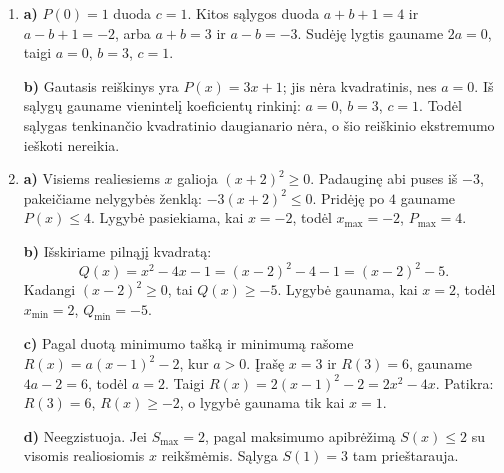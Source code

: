 \documentclass[12pt,a4paper]{article}
\begin{document}
\begin{enumerate}
\textbf{b)} $P(1)=3$, $P(-1)=-13$. Todėl $P(1)-P(-1)=3-(-13)=16=2b$.

\textbf{c)} Išskyrę pilnąjį kvadratą gauname $P(x)=-2(x-2)^2+5$. Kadangi $(x-2)^2\ge0$, padauginę abi puses iš $-2$ pakeičiame nelygybės ženklą: $-2(x-2)^2\le0$. Pridėję po $5$ gauname $P(x)\le5$. Lygybė gaunama tik kai $x=2$, todėl $x_{\max}=2$, $P_{\max}=5$.
\item \textbf{a)} $P(0)=1$ duoda $c=1$. Kitos sąlygos duoda $a+b+1=4$ ir $a-b+1=-2$, arba $a+b=3$ ir $a-b=-3$. Sudėję lygtis gauname $2a=0$, taigi $a=0$, $b=3$, $c=1$.

\textbf{b)} Gautasis reiškinys yra $P(x)=3x+1$; jis nėra kvadratinis, nes $a=0$. Iš sąlygų gauname vienintelį koeficientų rinkinį: $a=0$, $b=3$, $c=1$. Todėl sąlygas tenkinančio kvadratinio daugianario nėra, o šio reiškinio ekstremumo ieškoti nereikia.
\item \textbf{a)} Visiems realiesiems $x$ galioja $(x+2)^2\ge0$. Padauginę abi puses iš $-3$, pakeičiame nelygybės ženklą: $-3(x+2)^2\le0$. Pridėję po $4$ gauname $P(x)\le4$. Lygybė pasiekiama, kai $x=-2$, todėl $x_{\max}=-2$, $P_{\max}=4$.

\textbf{b)} Išskiriame pilnąjį kvadratą:
\[
Q(x)=x^2-4x-1=(x-2)^2-4-1=(x-2)^2-5.
\]
Kadangi $(x-2)^2\ge0$, tai $Q(x)\ge-5$. Lygybė gaunama, kai $x=2$, todėl $x_{\min}=2$, $Q_{\min}=-5$.

\textbf{c)} Pagal duotą minimumo tašką ir minimumą rašome $R(x)=a(x-1)^2-2$, kur $a>0$. Įrašę $x=3$ ir $R(3)=6$, gauname $4a-2=6$, todėl $a=2$. Taigi $R(x)=2(x-1)^2-2=2x^2-4x$. Patikra: $R(3)=6$, $R(x)\ge-2$, o lygybė gaunama tik kai $x=1$.

\textbf{d)} Neegzistuoja. Jei $S_{\max}=2$, pagal maksimumo apibrėžimą $S(x)\le2$ su visomis realiosiomis $x$ reikšmėmis. Sąlyga $S(1)=3$ tam prieštarauja.
\end{enumerate}
\end{document}

